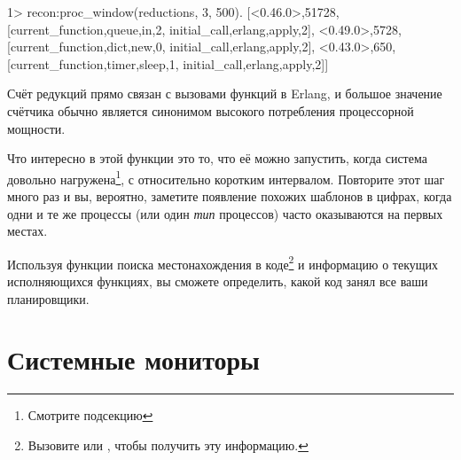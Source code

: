 \begin{VerbatimEshell}
1> recon:proc_window(reductions, 3, 500).
[{<0.46.0>,51728,
  [{current_function,{queue,in,2}},
   {initial_call,{erlang,apply,2}}]},
 {<0.49.0>,5728,
  [{current_function,{dict,new,0}},
   {initial_call,{erlang,apply,2}}]},
 {<0.43.0>,650,
  [{current_function,{timer,sleep,1}},
   {initial_call,{erlang,apply,2}}]}]
\end{VerbatimEshell}

Счёт редукций прямо связан с вызовами функций в Erlang, и большое значение счётчика обычно является синонимом высокого потребления процессорной мощности.

Что интересно в этой функции это то, что её можно запустить, когда система довольно нагружена\footnote{Смотрите подсекцию }, с относительно коротким интервалом. Повторите этот шаг много раз и вы, вероятно, заметите появление похожих шаблонов в цифрах, когда одни и те же процессы (или один \emph{тип} процессов) часто оказываются на первых местах.

Используя функции поиска местонахождения в коде\footnote{Вызовите  или , чтобы получить эту информацию.} и информацию о текущих исполняющихся функциях, вы сможете определить, какой код занял все ваши планировщики.


\section{Системные мониторы}
\label{sec:cpu-system-monitors}


